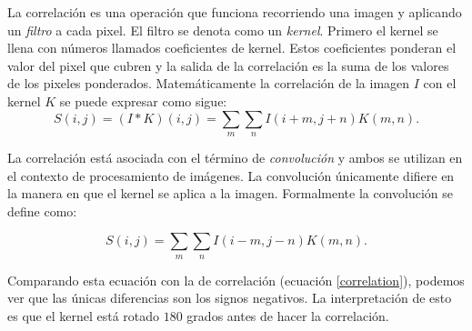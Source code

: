 


\begin{remark}
La correlación es una operación que funciona recorriendo una imagen y aplicando un
\textit{filtro} a cada pixel. El filtro se denota como un \textit{kernel}. Primero 
el kernel se llena con números llamados coeficientes de kernel. Estos coeficientes 
ponderan el valor del pixel que cubren y la salida de la correlación es la suma
de los valores de los pixeles ponderados. Matemáticamente la correlación de la imagen
$I$ con el kernel $K$ se puede expresar como sigue:
\begin{equation}\label{correlation}
    S(i,j) = (I * K)(i,j) = \sum_{m} \sum_{n} I(i+m, j+n) K(m,n).
\end{equation}
\end{remark}

La correlación está asociada con el término de \textit{convolución} y ambos se utilizan
en el contexto de procesamiento de imágenes. La convolución únicamente difiere en la manera
en que el kernel se aplica a la imagen. Formalmente la convolución se define como:

\[
S(i,j) = \sum_{m} \sum_{n} I(i-m, j-n) K(m,n).
\]

Comparando esta ecuación con la de correlación (ecuación \ref{correlation}), podemos
ver que las únicas diferencias son los signos negativos. La interpretación de esto
es que el kernel está rotado $180$ grados antes de hacer la correlación.

